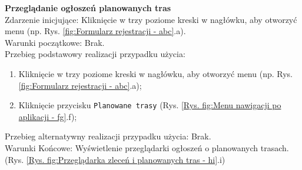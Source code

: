 \textbf{Przeglądanie ogłoszeń planowanych tras} \\
Zdarzenie inicjujące: Kliknięcie w trzy poziome kreski w nagłówku, aby otworzyć menu (np. Rys. \ref{fig:Formularz rejestracji - abc}.a). \\
Warunki początkowe: Brak. \\
Przebieg podstawowy realizacji przypadku użycia:
\begin{enumerate}
    \item Kliknięcie w trzy poziome kreski w nagłówku, aby otworzyć menu (np. Rys. \ref{fig:Formularz rejestracji - abc}.a);
    \item Kliknięcie przycisku \texttt{Planowane trasy} (Rys. \ref{Rys. fig:Menu nawigacji po aplikacji - fg}.f);
\end{enumerate}
Przebieg alternatywny realizacji przypadku użycia: Brak. \\
Warunki Końcowe: Wyświetlenie przeglądarki ogłoszeń o planowanych trasach. (Rys. \ref{Rys. fig:Przeglądarka zleceń i planowanych tras - hi}.i)\\

